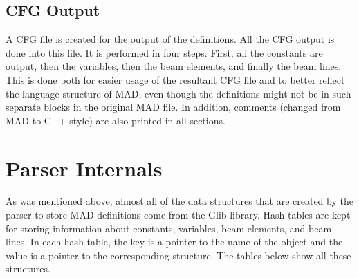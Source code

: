 \documentclass[12pt]{article}
\begin{document}
\subsection{CFG Output}
A CFG file is created for the output of the definitions. All the CFG
output is done into this file. It is performed in four steps. First,
all the constants are output, then the variables, then the beam elements,
and finally the beam lines. This is done both for easier usage of the
resultant CFG file and to better reflect the language structure of MAD,
even though the definitions might not be in such separate blocks in
the original MAD file. In addition, comments (changed from MAD to C++
style) are also printed in all sections.

\section{Parser Internals}
As was mentioned above, almost all of the data structures that are
created by the parser to store MAD definitions come from the Glib library.
Hash tables are kept for storing information about constants, variables,
beam elements, and beam lines. In each hash table, the key is a pointer
to the name of the object and the value is a pointer to the corresponding
structure. The tables below show all these structures.
\end{document}
